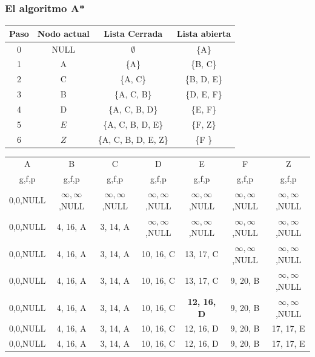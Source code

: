 \begin{frame}\frametitle{El algoritmo A*}
  \begin{table}
    \begin{tabular}{cccc}
      Paso & Nodo actual & Lista Cerrada & Lista abierta\\
      \hline
      0   & NULL & $\emptyset$          & \{A\}      \\
      1   & A    & \{A\}                & \{B, C\}   \\
      2   & C    & \{A, C\}             & \{B, D, E\}\\
      3   & B    & \{A, C, B\}          & \{D, E, F\}\\
      4   & D    & \{A, C, B, D\}       & \{E, F\}   \\
      5   & $E$  & \{A, C, B, D, E\}    & \{F, Z\}   \\
      6   & $Z$  & \{A, C, B, D, E, Z\} & \{F \}     \\
    \end{tabular}
  \end{table}
  \begin{table}
    \footnotesize
    \begin{tabular}{ccccccc}
      A & B & C & D & E & F & Z \\
      g,f,p & g,f,p & g,f,p & g,f,p & g,f,p & g,f,p & g,f,p\\
      \hline
      0,0,NULL & $\infty,\infty$,NULL & $\infty,\infty$,NULL & $\infty,\infty$,NULL & $\infty,\infty$,NULL & $\infty,\infty$,NULL & $\infty,\infty$,NULL\\
      0,0,NULL & 4, 16, A             & 3, 14, A             & $\infty,\infty$,NULL & $\infty,\infty$,NULL & $\infty,\infty$,NULL & $\infty,\infty$,NULL\\
      0,0,NULL & 4, 16, A             & 3, 14, A             & 10, 16, C            & 13, 17, C            & $\infty,\infty$,NULL & $\infty,\infty$,NULL\\
      0,0,NULL & 4, 16, A             & 3, 14, A             & 10, 16, C            & 13, 17, C            & 9, 20, B             & $\infty,\infty$,NULL\\
      0,0,NULL & 4, 16, A             & 3, 14, A             & 10, 16, C            & \textbf{12, 16, D}   & 9, 20, B             & $\infty,\infty$,NULL\\
      0,0,NULL & 4, 16, A             & 3, 14, A             & 10, 16, C            &         12, 16, D    & 9, 20, B             & 17, 17, E           \\
      0,0,NULL & 4, 16, A             & 3, 14, A             & 10, 16, C            &         12, 16, D    & 9, 20, B             & 17, 17, E           \\
    \end{tabular}
  \end{table}
\end{frame}

